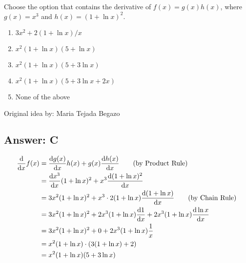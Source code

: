 
Choose the option that contains the derivative of $f(x) = g(x) h(x)$, where $g(x) = x^3$ and $h(x) = (1 + \ln x)^2$.

\begin{enumerate}[label={\Alph*.}]
    \item $3x^2 + 2 (1 + \ln x)/x$
    \item $x^2 (1 + \ln x) (5 + \ln x)$
    \item $x^2 (1 + \ln x) (5 + 3 \ln x)$
    \item $x^2 (1 + \ln x) (5 + 3 \ln x + 2x)$
    \item None of the above
\end{enumerate}

Original idea by: Maria Tejada Begazo


\subsection*{Answer: C}

\begin{align*}
    \dv{x} f(x) &= \dv{g(x)}{x} h(x) + g(x) \dv{h(x)}{x}
            \tag*{(by Product Rule)} \\
        &= {\dv{x^3}{x}} (1 + \ln x)^2 + x^3 \dv{(1 + \ln x)^2}{x} \\
        &= 3 x^2 (1 + \ln x)^2 + x^3 \cdot 2 (1 + \ln x) \dv{(1 + \ln x)}{x}
            \tag*{(by Chain Rule)} \\
        &= 3 x^2 (1 + \ln x)^2 + 2 x^3 (1 + \ln x) \dv{1}{x} + 2 x^3 (1 + \ln x) \dv{\ln x}{x} \\
        &= 3 x^2 (1 + \ln x)^2 + 0 + 2 x^3 (1 + \ln x) \frac{1}{x} \\
        &= x^2 (1 + \ln x) \cdot (3 (1 + \ln x) + 2) \\
        &= x^2 (1 + \ln x) (5 + 3 \ln x)
\end{align*}
